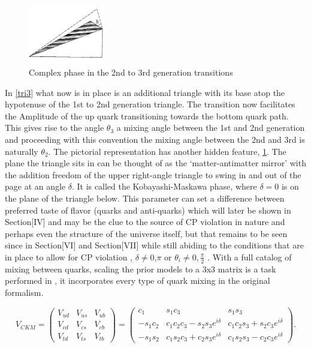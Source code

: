 \begin{figure}[h]
\includegraphics[angle=1.1,width=0.3\textwidth]{figs/ckmfig4b.jpg}
\caption{Complex phase in the 2nd to 3rd generation transitions}
\label{tri4}
\end{figure}

In \cref{tri3} what now is in place is an additional triangle with its base atop the hypotenuse of the 1st to 2nd generation triangle. The transition now facilitates the Amplitude of the up quark transitioning towards the bottom quark path. This gives rise to the angle $\theta_3$ a mixing angle between the 1st and 2nd generation and proceeding with this convention the mixing angle between the 2nd and 3rd is naturally $\theta_2$. The pictorial representation has another hidden feature, \cref{tri4}. The plane the triangle sits in can be thought of as the ‘matter-antimatter mirror’ with the addition freedom of the upper right-angle triangle to swing in and out of the page at an angle $\delta$. It is called the Kobayashi-Maskawa phase, where $\delta=0$ is on the plane of the triangle below. This parameter can set a difference between preferred taste of flavor (quarks and anti-quarks) which will later be shown in Section[IV] and may be the clue to the source of CP violation in nature and perhaps even the structure of the universe itself, but that remains to be seen since in Section[VI] and Section[VII] while still abiding to the conditions that are in place to allow for CP violation , $\delta\neq0$,$\pi$ or $\theta_i\neq0,\frac{\pi}{2}$  \cite{CKM4} .
With a full catalog of mixing between quarks, scaling the prior models to a 3x3 matrix is a task performed in \cite{CKM3} , it incorporates every type of quark mixing in the original formalism. 

\begin{equation}\label{ckm1}
V_{CKM} = \left( \begin{array}{ccc} V_{ud} & V_{us} & V_{ub} \\ V_{cd} & V_{cs} & V_{cb} \\ V_{td} & V_{ts} & V_{tb} \end{array}\right) = \left( \begin{array}{ccc} c_1 & s_1 c_3 & s_1 s_3 \\ -s_1 c_2 & c_1 c_2 c_3 -s_2 s_3 e^{i\delta} & c_1 c_2 s_3 + s_2 c_3 e^{i\delta} \\ -s_1 s_2 & c_1 s_2 c_3 +c_2 s_3 e^{i\delta} & c_1 s_2 s_3 - c_2 c_3 e^{i\delta} \end{array} \right). 
\end{equation}

